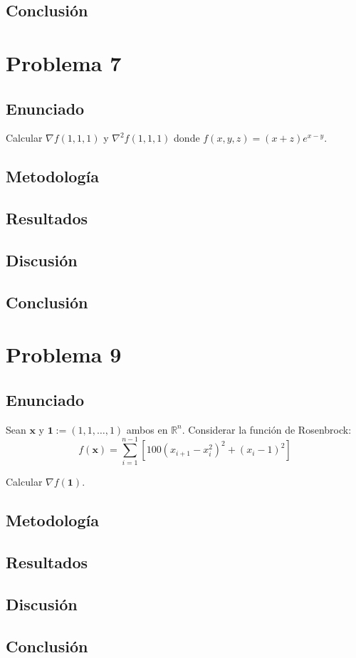 \documentclass{article}
\begin{document}
\subsection{Conclusión}

\section{Problema 7}

\subsection{Enunciado}
Calcular $\nabla f(1, 1, 1)$ y $\nabla^2 f(1, 1, 1)$ donde $f(x, y, z) = (x + z)e^{x-y}$.

\subsection{Metodología}

\subsection{Resultados}
\setcounter{equation}{0}

\subsection{Discusión}

\subsection{Conclusión}

\section{Problema 9}

\subsection{Enunciado}
Sean $\mathbf{x}$ y $\mathbf{1} := (1, 1, \ldots, 1)$ ambos en $\mathbb{R}^n$. Considerar la función de Rosenbrock:
$$f(\mathbf{x}) = \sum_{i=1}^{n-1} \left[100(x_{i+1} - x_i^2)^2 + (x_i - 1)^2\right]$$

Calcular $\nabla f(\mathbf{1})$.

\subsection{Metodología}

\subsection{Resultados}
\setcounter{equation}{0}

\subsection{Discusión}

\subsection{Conclusión}
\end{document}
